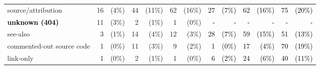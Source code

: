\documentclass[smallextended]{svjour3}       %
\newcommand{\fix}[1]{\textcolor{black}{#1}}
\newcommand{\minor}[1]{\textcolor{black}{#1}}
\begin{document}
\begin{table}[t]
{\begin{tabular}{lr@{}rr@{}rr@{}r|r@{}rr@{}rr@{}r}
source/attribution                             & 16                            & (4\%)                             & 44                            & (11\%)                            & 62                            & (16\%)                            & \fix{27}                            & \fix{(7\%)}                             & \multicolumn{1}{r|}{\fix{62}}                            & \fix{(16\%)}                            & \fix{75}                            & \fix{(20\%)}                            \\
\minor{\textbf{unknown (404)}}                  & 11                            & (3\%)                             & 2                             & (1\%)                             & 1                             & (0\%)                             & \fix{-}                             & \fix{-}                                 & \multicolumn{1}{r|}{\fix{-}}                             & \fix{-}                                 & \fix{-}                             & \fix{-}                                 \\
see-also                                       & 3                             & (1\%)                             & 14                            & (4\%)                             & 12                            & (3\%)                             & \fix{28}                            & \fix{(7\%)}                             & \multicolumn{1}{r|}{\fix{59}}                            & \fix{(15\%)}                            & \fix{51}                            & \fix{(13\%)}                            \\
commented-out source code                      & 1                             & (0\%)                             & 11                            & (3\%)                             & 9                             & (2\%)                             & \fix{1}                             & \fix{(0\%)}                             & \multicolumn{1}{r|}{\fix{17}}                            & \fix{(4\%)}                             & \fix{70}                            & \fix{(19\%)}                            \\
link-only                                      & 1                             & (0\%)                             & 2                             & (1\%)                             & 1                             & (0\%)                             & \fix{6}                             & \fix{(2\%)}                             & \multicolumn{1}{r|}{\fix{24}}                            & \fix{(6\%)}                             & \fix{40}                            & \fix{(11\%)}                            \\

\end{tabular}}
\end{table}
\end{document}
